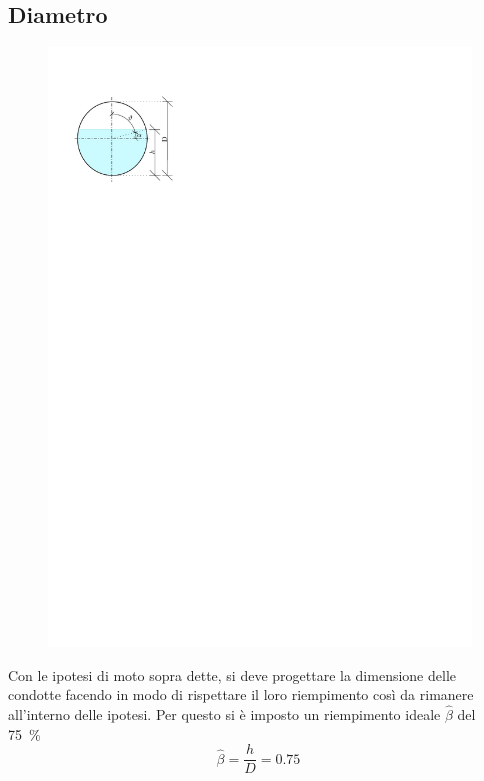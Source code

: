 \subsection{Diametro}
\begin{figure}[H]
    \centering
    \includegraphics[]{IMG/RiempimentoCondotta.pdf}
\end{figure}
Con le ipotesi di moto sopra dette, si deve progettare la dimensione delle condotte facendo in modo di rispettare il loro riempimento così da rimanere all'interno delle ipotesi. 
Per questo si è imposto un riempimento ideale $\hat{\beta}$ del \SI{75}{\percent}
\begin{equation}
    \hat{\beta} = \frac{h}{D} = \SI{0.75}{}
\end{equation}

